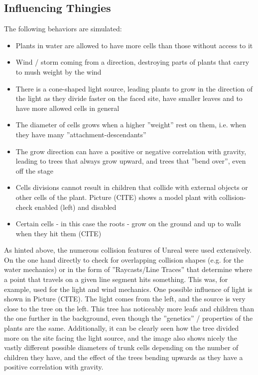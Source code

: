\documentclass[11pt]{scrartcl}
\begin{document}
\subsection{Influencing Thingies} \label{cptr:Influencing}
The following behaviors are simulated:
\begin{itemize}
	\item Plants in water are allowed to have more cells than those without access to it
	\item Wind / storm coming from a direction, destroying parts of plants that carry to mush weight by the wind
	\item There is a cone-shaped light source, leading plants to grow in the direction of the light as they divide faster on the faced site, have smaller leaves and to have more allowed cells in general
	\item The diameter of cells grows when a higher ''weight'' rest on them, i.e. when they have many ''attachment-descendants''
	\item The grow direction can have a positive or negative correlation with gravity, leading to trees that always grow upward, and trees that ''bend over'', even off the stage
	\item Cells divisions cannot result in children that collide with external objects or other cells of the plant. Picture (CITE) shows a model plant with collision-check enabled (left) and disabled
	\item Certain cells - in this case the roots - grow on the ground and up to walls when they hit them (CITE)
\end{itemize}

As hinted above, the numerous collision features of Unreal were used extensively. On the one hand directly to check for overlapping collision shapes (e.g. for the water mechanics) or in the form of ''Raycasts/Line Traces'' that determine where a point that travels on a given line segment hits something. This was, for example, used for the light and wind mechanics.
One possible influence of light is shown in Picture (CITE). The light comes from the left, and the source is very close to the tree on the left. This tree has noticeably more leafs and children than the one further in the background, even though the ''genetics'' / properties of the plants are the same. Additionally, it can be clearly seen how the tree divided more on the site facing the light source, and the image also shows nicely the vastly different possible diameters of trunk cells depending on the number of children they have, and the effect of the trees bending upwards as they have a positive correlation with gravity. 
\end{document}
